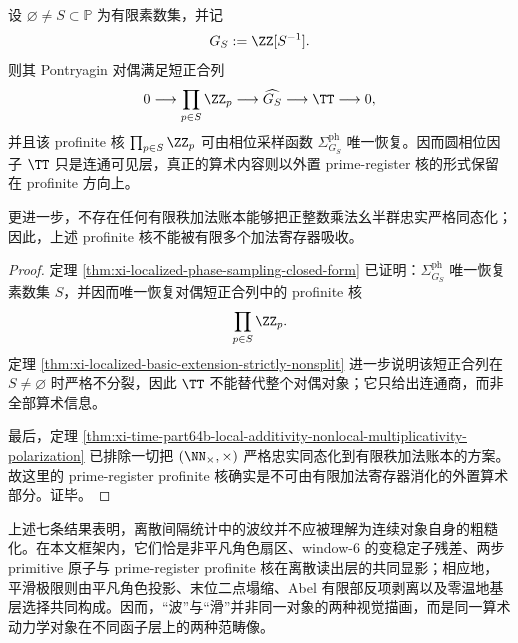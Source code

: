 \begin{theorem}[连续相位层与外置算术核]\label{thm:xi-time-part67-continuous-phase-external-arithmetic-kernel}
设 \(\varnothing\neq S\subset\mathbb P\) 为有限素数集，并记
\[
G_S:=\ZZ[S^{-1}].
\]
则其 Pontryagin 对偶满足短正合列
\[
0\longrightarrow \prod_{p\in S}\ZZ_p
\longrightarrow \widehat{G_S}
\longrightarrow \TT
\longrightarrow 0,
\]
并且该 profinite 核 \(\prod_{p\in S}\ZZ_p\) 可由相位采样函数 \(\Sigma^{\mathrm{ph}}_{G_S}\) 唯一恢复。因而圆相位因子 \(\TT\) 只是连通可见层，真正的算术内容则以外置 prime-register 核的形式保留在 profinite 方向上。

更进一步，不存在任何有限秩加法账本能够把正整数乘法幺半群忠实严格同态化；因此，上述 profinite 核不能被有限多个加法寄存器吸收。
\end{theorem}
\begin{proof}
定理 \ref{thm:xi-localized-phase-sampling-closed-form} 已证明：\(\Sigma^{\mathrm{ph}}_{G_S}\) 唯一恢复素数集 \(S\)，并因而唯一恢复对偶短正合列中的 profinite 核
\[
\prod_{p\in S}\ZZ_p.
\]
定理 \ref{thm:xi-localized-basic-extension-strictly-nonsplit} 进一步说明该短正合列在 \(S\neq\varnothing\) 时严格不分裂，因此 \(\TT\) 不能替代整个对偶对象；它只给出连通商，而非全部算术信息。

最后，定理 \ref{thm:xi-time-part64b-local-additivity-nonlocal-multiplicativity-polarization} 已排除一切把
\(
(\NN_{\times},\times)
\)
严格忠实同态化到有限秩加法账本的方案。故这里的 prime-register profinite 核确实是不可由有限加法寄存器消化的外置算术部分。证毕。
\end{proof}

\noindent
上述七条结果表明，离散间隔统计中的波纹并不应被理解为连续对象自身的粗糙化。在本文框架内，它们恰是非平凡角色扇区、window-\(6\) 的变稳定子残差、两步 primitive 原子与 prime-register profinite 核在离散读出层的共同显影；相应地，平滑极限则由平凡角色投影、末位二点塌缩、Abel 有限部反项剥离以及零温地基层选择共同构成。因而，“波”与“滑”并非同一对象的两种视觉描画，而是同一算术动力学对象在不同函子层上的两种范畴像。





\endinput
